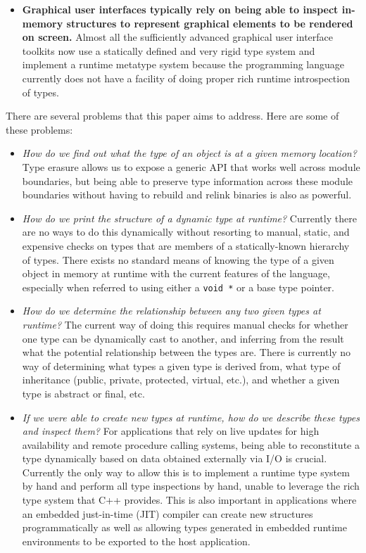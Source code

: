 \begin{itemize}
\item \textbf{Graphical user interfaces typically rely on being able to inspect
in­-memory structures to represent graphical elements to be rendered on screen.}
Almost all the sufficiently advanced graphical user interface toolkits now use a
statically­ defined and very rigid type system and implement a runtime meta­type
system because the programming language currently does not have a facility of
doing proper rich runtime introspection of types.
\end{itemize}

There are several problems that this paper aims to address. Here are some of
these problems:

\begin{itemize}
\item \emph{How do we find out what the type of an object is at a given memory
location?}  Type erasure allows us to expose a generic API that works well
across module boundaries, but being able to preserve type information across
these module boundaries without having to rebuild and relink binaries is also as
powerful.

\item \emph{How do we print the structure of a dynamic type at runtime?}
Currently there are no ways to do this dynamically without resorting to manual,
static, and expensive checks on types that are members of a statically-known
hierarchy of types. There exists no standard means of knowing the type of a
given object in memory at runtime with the current features of the language,
especially when referred to using either a \verb+void *+ or a base type pointer.

\item \emph{How do we determine the relationship between any two given types at
runtime?} The current way of doing this requires manual checks for whether one
type can be dynamically cast to another, and inferring from the result what the
potential relationship between the types are. There is currently no way of
determining what types a given type is derived from, what type of inheritance
(public, private, protected, virtual, etc.), and whether
a given type is abstract or final, etc.

\item \emph{If we were able to create new types at runtime, how do we describe
these types and inspect them?} For applications that rely on live updates for
high availability and remote procedure calling systems, being able to
reconstitute a type dynamically based on data obtained externally via I/O is
crucial. Currently the only way to allow this is to implement a runtime type
system by hand and perform all type inspections by hand, unable to leverage the
rich type system that C++ provides. This is also important in applications where
an embedded just-in-time (JIT) compiler can create new structures
programmatically as well as allowing types generated in embedded runtime
environments to be exported to the host application.
\end{itemize}
